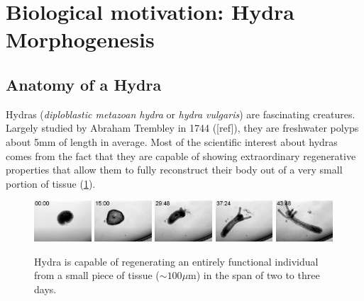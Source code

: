 
\newpage
\section{Biological motivation: Hydra Morphogenesis}

\subsection{Anatomy of a Hydra}

Hydras (\textit{diploblastic metazoan hydra} or \textit{hydra vulgaris}) are fascinating creatures. Largely studied by Abraham Trembley in 1744 ([ref]), they are freshwater polyps about 5mm of length in average. Most of the scientific interest about hydras comes from the fact that they are capable of showing extraordinary regenerative properties that allow them to fully reconstruct their body out of a very small portion of tissue (\ref{hydraregen}).
\begin{figure}[h]
\label{hydraregen}
\includegraphics[width=0.19\textwidth]{figures/hydra_growth1}
\includegraphics[width=0.19\textwidth]{figures/hydra_growth2}
\includegraphics[width=0.19\textwidth]{figures/hydra_growth3}	\includegraphics[width=0.19\textwidth]{figures/hydra_growth4}
\includegraphics[width=0.19\textwidth]{figures/hydra_growth5}
\caption{Hydra is capable of regenerating an entirely functional individual from a small piece of tissue ($\sim 100\mu $m) in the span of two to three days. }
\end{figure}

